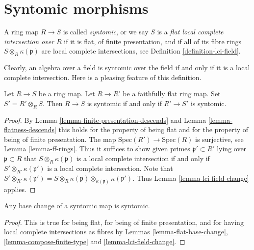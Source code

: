 \section{Syntomic morphisms}
\label{section-syntomic}

\begin{definition}
\label{definition-lci}
A ring map $R \to S$ is called {\it syntomic}, or we say $S$ is a
{\it flat local complete intersection over $R$}
if it is flat, of finite presentation, and if all of its fibre rings
$S \otimes_R \kappa(\mathfrak p)$ are local complete intersections,
see Definition \ref{definition-lci-field}.
\end{definition}

\noindent
Clearly, an algebra over a field is syntomic over the field
if and only if it is a local complete intersection. Here is
a pleasing feature of this definition.

\begin{lemma}
\label{lemma-syntomic-descends}
Let $R \to S$ be a ring map.
Let $R \to R'$ be a faithfully flat ring map.
Set $S' = R'\otimes_R S$.
Then $R \to S$ is syntomic if and only if $R' \to S'$ is syntomic.
\end{lemma}

\begin{proof}
By Lemma \ref{lemma-finite-presentation-descends} and
Lemma \ref{lemma-flatness-descends} this holds for the property
of being flat and for the property of being of finite presentation.
The map $\text{Spec}(R') \to \text{Spec}(R)$ is surjective,
see Lemma \ref{lemma-ff-rings}. Thus it suffices to show
given primes $\mathfrak p' \subset R'$ lying over $\mathfrak p \subset R$
that $S \otimes_R \kappa(\mathfrak p)$ is a local complete
intersection if and only if $S' \otimes_{R'} \kappa(\mathfrak p')$
is a local complete intersection. Note that
$S' \otimes_{R'} \kappa(\mathfrak p') =
S \otimes_R \kappa(\mathfrak p)
\otimes_{\kappa(\mathfrak p)} \kappa(\mathfrak p')$.
Thus Lemma \ref{lemma-lci-field-change} applies.
\end{proof}

\begin{lemma}
\label{lemma-base-change-syntomic}
Any base change of a syntomic map is syntomic.
\end{lemma}

\begin{proof}
This is true for being flat, for being of finite presentation,
and for having local complete intersections as fibres by
Lemmas \ref{lemma-flat-base-change}, \ref{lemma-compose-finite-type} and
\ref{lemma-lci-field-change}.
\end{proof}

